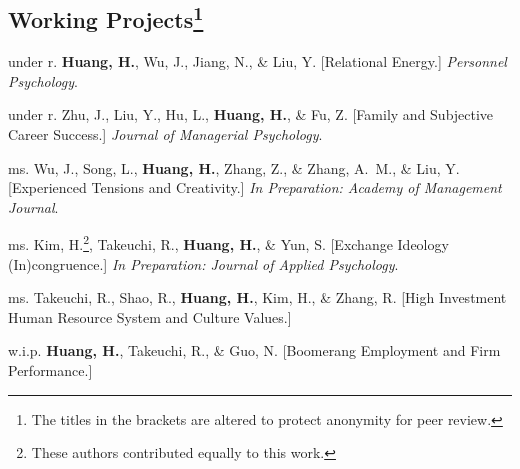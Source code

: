 \documentclass[12pt,letterpaper]{report} %
\begin{document}
    
    \subsection*{Working Projects\footnote{The titles in the brackets are altered to protect anonymity for peer review.}}
    \begin{tablist}

        \item[under r.]\tab{}\textbf{Huang, H.}, Wu, J., Jiang, N., \& Liu, Y. [Relational Energy.] \textit{Personnel Psychology}.
        
        \item[under r.]\tab{}Zhu, J., Liu, Y., Hu, L., \textbf{Huang, H.}, \& Fu, Z. [Family and Subjective Career Success.] \textit{Journal of Managerial Psychology}.
        
        \item[ms.]\tab{}Wu, J., Song, L., \textbf{Huang, H.},  Zhang, Z., \& Zhang, A.~M., \& Liu, Y. [Experienced Tensions and Creativity.]  \textit{In Preparation: Academy of Management Journal}.
        
        \item[ms.]\tab{}Kim, H.\footnote{\label{fn:eqauth}These authors contributed equally to this work.}, Takeuchi, R., \textbf{Huang, H.}, \& Yun, S. [Exchange Ideology (In)congruence.] \textit{In Preparation: Journal of Applied Psychology}.
        \item[ms.]\tab{}Takeuchi, R., Shao, R., \textbf{Huang, H.}, Kim, H., \& Zhang, R. [High Investment Human Resource System and Culture Values.] %
        
        \item[w.i.p.]\tab{}\textbf{Huang, H.}, Takeuchi, R., \& Guo, N. [Boomerang Employment and Firm Performance.] %
    \end{tablist}



\end{document}
